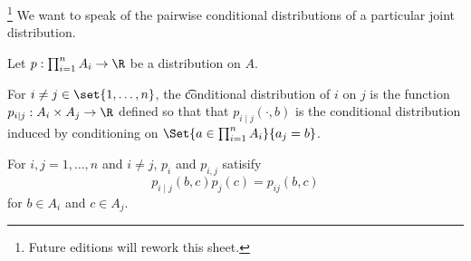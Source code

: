 
  \ifhmode\unskip\fi\footnote{
Future editions will rework this sheet.
  }
We want to speak of the pairwise conditional distributions of a particular joint distribution.

Let $p: \prod_{i = 1}^{n} A_i \to \R $ be a distribution on $A$.

For $i \neq j \in \set{1, \dots, n}$, the \t{conditional distribution} of $i$ on $j$ is the function $p_{i \mid j}: A_i \times A_j \to \R $ defined so that that $p_{i \mid j}(\cdot, b)$ is the conditional distribution induced by conditioning on $\Set{a \in \prod_{i = 1}^{n} A_i }{a_j = b}$.

For $i,j = 1, \dots, n$ and $i \neq j$, $p_i$ and $p_{i,j}$ satisify
  \[
p_{i \mid j}(b, c)p_{j}(c) = p_{ij}(b, c)
  \]
for $b \in A_i$ and $c \in A_j$.

\blankpage
